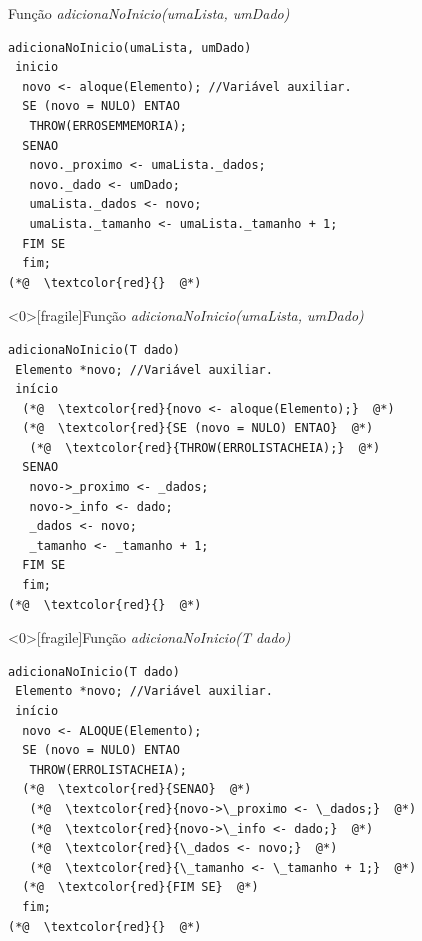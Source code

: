 \documentclass[12pt,table,xcolor={dvipsnames}]{beamer}
\begin{document}
\begin{frame}[fragile]{Função \normalsize\textit{adicionaNoInicio(umaLista, umDado)}}
\begin{lstlisting}
adicionaNoInicio(umaLista, umDado)
 inicio
  novo <- aloque(Elemento); //Variável auxiliar.
  SE (novo = NULO) ENTAO
   THROW(ERROSEMMEMORIA);
  SENAO
   novo._proximo <- umaLista._dados;
   novo._dado <- umDado;
   umaLista._dados <- novo;
   umaLista._tamanho <- umaLista._tamanho + 1;
  FIM SE
  fim;
(*@  \textcolor{red}{}  @*)
\end{lstlisting}
\end{frame}

\begin{frame}<0>[fragile]{Função \textit{adicionaNoInicio(umaLista, umDado)}}
\begin{lstlisting}
adicionaNoInicio(T dado)
 Elemento *novo; //Variável auxiliar.
 início
  (*@  \textcolor{red}{novo <- aloque(Elemento);}  @*)
  (*@  \textcolor{red}{SE (novo = NULO) ENTAO}  @*)
   (*@  \textcolor{red}{THROW(ERROLISTACHEIA);}  @*)
  SENAO
   novo->_proximo <- _dados;
   novo->_info <- dado;
   _dados <- novo;
   _tamanho <- _tamanho + 1;
  FIM SE
  fim;
(*@  \textcolor{red}{}  @*)
\end{lstlisting}
\end{frame}

\begin{frame}<0>[fragile]{Função \textit{adicionaNoInicio(T dado)}}
\begin{lstlisting}
adicionaNoInicio(T dado)
 Elemento *novo; //Variável auxiliar.
 início
  novo <- ALOQUE(Elemento);
  SE (novo = NULO) ENTAO
   THROW(ERROLISTACHEIA);
  (*@  \textcolor{red}{SENAO}  @*)
   (*@  \textcolor{red}{novo->\_proximo <- \_dados;}  @*)
   (*@  \textcolor{red}{novo->\_info <- dado;}  @*)
   (*@  \textcolor{red}{\_dados <- novo;}  @*)
   (*@  \textcolor{red}{\_tamanho <- \_tamanho + 1;}  @*)
  (*@  \textcolor{red}{FIM SE}  @*)
  fim;
(*@  \textcolor{red}{}  @*)
\end{lstlisting}
\end{frame}
\end{document}
